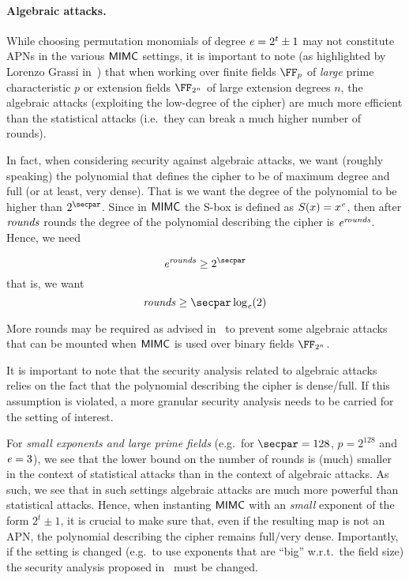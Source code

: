 \paragraph{Algebraic attacks.}

While choosing permutation monomials of degree $\mathit{e}{} = 2^t \pm 1$ may not constitute APNs in the various $\mathsf{MIMC{}}$ settings, it is important to note (as highlighted by Lorenzo Grassi in~\cite{mimc-security-communications}) that when working over finite fields $\FFx{p}$ of \emph{large} prime characteristic $p$ or extension fields $\FFx{2^n}$ of large extension degrees $n$, the algebraic attacks (exploiting the low-degree of the cipher) are much more efficient than the statistical attacks (i.e.~they can break a much higher number of rounds).

In fact, when considering security against algebraic attacks, we want (roughly speaking) the polynomial that defines the cipher to be of maximum degree and full (or at least, very dense). That is we want the degree of the polynomial to be higher than $2^{\secpar}$. Since in $\mathsf{MIMC{}}$ the S-box is defined as $S(x) = x^{\mathit{e}{}}$, then after $\mathit{rounds}$ rounds the degree of the polynomial describing the cipher is $\mathit{e}{}^{\mathit{rounds}}$. Hence, we need

\[
    \exponent{}^{\rounds} \geq 2^{\secpar}
\]
that is, we want
\[
    \rounds \geq \secpar \log_{\exponent}(2)
\]

\begin{remark}
    More rounds may be required as advised in~\cite{DBLP:conf/asiacrypt/Eichlseder0LORS20} to prevent some algebraic attacks that can be mounted when $\mathsf{MIMC{}}$ is used over binary fields $\FFx{2^n}$.
\end{remark}

It is important to note that the security analysis related to algebraic attacks relies on the fact that the polynomial describing the cipher is dense/full. If this assumption is violated, a more granular security analysis needs to be carried for the setting of interest.

\begin{notebox}
    For \emph{small exponents and large prime fields} (e.g.~for $\secpar = 128$, $p = 2^{128}$ and $\mathit{e}{} = 3$), we see that the lower bound on the number of rounds is (much) smaller in the context of statistical attacks than in the context of algebraic attacks. As such, we see that in such settings algebraic attacks are much more powerful than statistical attacks. Hence, when instanting $\mathsf{MIMC{}}$ with an \emph{small} exponent of the form $2^t \pm 1$, it is crucial to make sure that, even if the resulting map is not an APN, the polynomial describing the cipher remains full/very dense. Importantly, if the setting is changed (e.g.~to use exponents that are ``big'' w.r.t.~the field size) the security analysis proposed in~\cite{albrecht2016mimc} must be changed.
\end{notebox}

